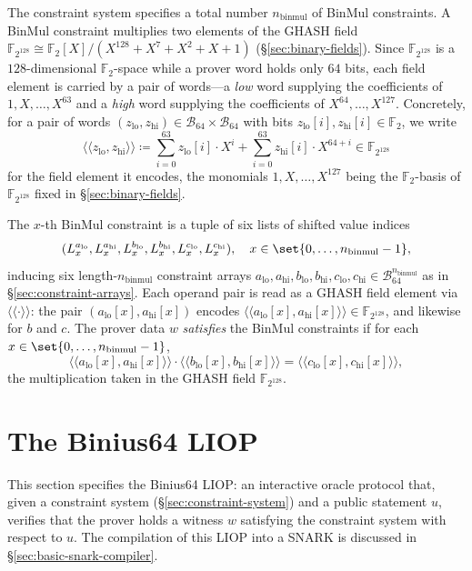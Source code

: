 \documentclass{article}
\theoremstyle{definition}
\newcommand{\BB}{\mathcal{B}}
\newcommand{\FF}[1]{\mathbb{F}_{#1}}
\newcommand{\gval}[1]{\langle\!\langle #1 \rangle\!\rangle}
\begin{document}
The constraint system specifies a total number $n_\text{binmul}$ of BinMul constraints. A BinMul constraint multiplies two elements of the GHASH field $\FF{2^{128}} \cong \FF{2}[X] / (X^{128} + X^7 + X^2 + X + 1)$ (\S\ref{sec:binary-fields}). Since $\FF{2^{128}}$ is a $128$-dimensional $\FF{2}$-space while a prover word holds only $64$ bits, each field element is carried by a pair of words---a \emph{low} word supplying the coefficients of $1, X, \ldots, X^{63}$ and a \emph{high} word supplying the coefficients of $X^{64}, \ldots, X^{127}$. Concretely, for a pair of words $(z_\text{lo}, z_\text{hi}) \in \BB_{64} \times \BB_{64}$ with bits $z_\text{lo}[i], z_\text{hi}[i] \in \FF{2}$, we write
\[
  \gval{z_\text{lo}, z_\text{hi}} \coloneqq \sum_{i = 0}^{63} z_\text{lo}[i] \cdot X^i + \sum_{i = 0}^{63} z_\text{hi}[i] \cdot X^{64 + i} \in \FF{2^{128}}
\]
for the field element it encodes, the monomials $1, X, \ldots, X^{127}$ being the $\FF{2}$-basis of $\FF{2^{128}}$ fixed in \S\ref{sec:binary-fields}.

The $x$-th BinMul constraint is a tuple of six lists of shifted value indices
\[
  (L^{a_\text{lo}}_x, L^{a_\text{hi}}_x, L^{b_\text{lo}}_x, L^{b_\text{hi}}_x, L^{c_\text{lo}}_x, L^{c_\text{hi}}_x), \quad x \in \set{0, \ldots, n_\text{binmul} - 1},
\]
inducing six length-$n_\text{binmul}$ constraint arrays $a_\text{lo}, a_\text{hi}, b_\text{lo}, b_\text{hi}, c_\text{lo}, c_\text{hi} \in \BB_{64}^{n_\text{binmul}}$ as in \S\ref{sec:constraint-arrays}. Each operand pair is read as a GHASH field element via $\gval{\cdot}$: the pair $(a_\text{lo}[x], a_\text{hi}[x])$ encodes $\gval{a_\text{lo}[x], a_\text{hi}[x]} \in \FF{2^{128}}$, and likewise for $b$ and $c$. The prover data $w$ \emph{satisfies} the BinMul constraints if for each $x \in \set{0, \ldots, n_\text{binmul} - 1}$,
\[
  \gval{a_\text{lo}[x], a_\text{hi}[x]} \cdot \gval{b_\text{lo}[x], b_\text{hi}[x]} = \gval{c_\text{lo}[x], c_\text{hi}[x]},
\]
the multiplication taken in the GHASH field $\FF{2^{128}}$.

\section{The Binius64 LIOP}
\label{sec:binius-liop}

This section specifies the Binius64 LIOP: an interactive oracle protocol that, given a constraint system (\S\ref{sec:constraint-system}) and a public statement $u$, verifies that the prover holds a witness $w$ satisfying the constraint system with respect to $u$. The compilation of this LIOP into a SNARK is discussed in \S\ref{sec:basic-snark-compiler}.
\end{document}

